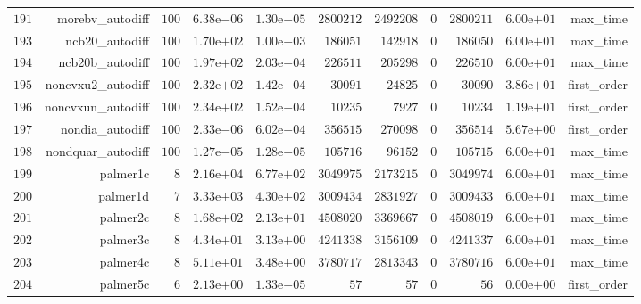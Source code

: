 \documentclass[varwidth=20cm,crop=true]{standalone}
\begin{document}
\begin{longtable}{rrrrrrrrrrr}
  \(   191\) & morebv\_autodiff & \(   100\) & \( 6.38\)e\(-06\) & \( 1.30\)e\(-05\) & \(2800212\) & \(2492208\) & \(     0\) & \(2800211\) & \( 6.00\)e\(+01\) & max\_time \\
  \(   193\) & ncb20\_autodiff & \(   100\) & \( 1.70\)e\(+02\) & \( 1.00\)e\(-03\) & \(186051\) & \(142918\) & \(     0\) & \(186050\) & \( 6.00\)e\(+01\) & max\_time \\
  \(   194\) & ncb20b\_autodiff & \(   100\) & \( 1.97\)e\(+02\) & \( 2.03\)e\(-04\) & \(226511\) & \(205298\) & \(     0\) & \(226510\) & \( 6.00\)e\(+01\) & max\_time \\
  \(   195\) & noncvxu2\_autodiff & \(   100\) & \( 2.32\)e\(+02\) & \( 1.42\)e\(-04\) & \( 30091\) & \( 24825\) & \(     0\) & \( 30090\) & \( 3.86\)e\(+01\) & first\_order \\
  \(   196\) & noncvxun\_autodiff & \(   100\) & \( 2.34\)e\(+02\) & \( 1.52\)e\(-04\) & \( 10235\) & \(  7927\) & \(     0\) & \( 10234\) & \( 1.19\)e\(+01\) & first\_order \\
  \(   197\) & nondia\_autodiff & \(   100\) & \( 2.33\)e\(-06\) & \( 6.02\)e\(-04\) & \(356515\) & \(270098\) & \(     0\) & \(356514\) & \( 5.67\)e\(+00\) & first\_order \\
  \(   198\) & nondquar\_autodiff & \(   100\) & \( 1.27\)e\(-05\) & \( 1.28\)e\(-05\) & \(105716\) & \( 96152\) & \(     0\) & \(105715\) & \( 6.00\)e\(+01\) & max\_time \\
  \(   199\) & palmer1c & \(     8\) & \( 2.16\)e\(+04\) & \( 6.77\)e\(+02\) & \(3049975\) & \(2173215\) & \(     0\) & \(3049974\) & \( 6.00\)e\(+01\) & max\_time \\
  \(   200\) & palmer1d & \(     7\) & \( 3.33\)e\(+03\) & \( 4.30\)e\(+02\) & \(3009434\) & \(2831927\) & \(     0\) & \(3009433\) & \( 6.00\)e\(+01\) & max\_time \\
  \(   201\) & palmer2c & \(     8\) & \( 1.68\)e\(+02\) & \( 2.13\)e\(+01\) & \(4508020\) & \(3369667\) & \(     0\) & \(4508019\) & \( 6.00\)e\(+01\) & max\_time \\
  \(   202\) & palmer3c & \(     8\) & \( 4.34\)e\(+01\) & \( 3.13\)e\(+00\) & \(4241338\) & \(3156109\) & \(     0\) & \(4241337\) & \( 6.00\)e\(+01\) & max\_time \\
  \(   203\) & palmer4c & \(     8\) & \( 5.11\)e\(+01\) & \( 3.48\)e\(+00\) & \(3780717\) & \(2813343\) & \(     0\) & \(3780716\) & \( 6.00\)e\(+01\) & max\_time \\
  \(   204\) & palmer5c & \(     6\) & \( 2.13\)e\(+00\) & \( 1.33\)e\(-05\) & \(    57\) & \(    57\) & \(     0\) & \(    56\) & \( 0.00\)e\(+00\) & first\_order \\

\end{longtable}
\end{document}
